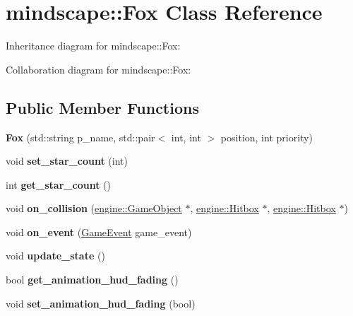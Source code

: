 \hypertarget{classmindscape_1_1_fox}{}\section{mindscape\+:\+:Fox Class Reference}
\label{classmindscape_1_1_fox}


Inheritance diagram for mindscape\+:\+:Fox\+:


Collaboration diagram for mindscape\+:\+:Fox\+:
\subsection*{Public Member Functions}
\begin{DoxyCompactItemize}
\item 
{\bfseries Fox} (std\+::string p\+\_\+name, std\+::pair$<$ int, int $>$ position, int priority)\hypertarget{classmindscape_1_1_fox_a9c5e270000519e07ded5c549d16ad057}{}\label{classmindscape_1_1_fox_a9c5e270000519e07ded5c549d16ad057}

\item 
void {\bfseries set\+\_\+star\+\_\+count} (int)\hypertarget{classmindscape_1_1_fox_a6ee5b7c313ccc0d08fbf51ffddd09e72}{}\label{classmindscape_1_1_fox_a6ee5b7c313ccc0d08fbf51ffddd09e72}

\item 
int {\bfseries get\+\_\+star\+\_\+count} ()\hypertarget{classmindscape_1_1_fox_af8dc5d2ee06af247f7de5c7f374f20e5}{}\label{classmindscape_1_1_fox_af8dc5d2ee06af247f7de5c7f374f20e5}

\item 
void {\bfseries on\+\_\+collision} (\hyperlink{classengine_1_1_game_object}{engine\+::\+Game\+Object} $\ast$, \hyperlink{classengine_1_1_hitbox}{engine\+::\+Hitbox} $\ast$, \hyperlink{classengine_1_1_hitbox}{engine\+::\+Hitbox} $\ast$)\hypertarget{classmindscape_1_1_fox_a29feec4478a5d1440cfd901417fec6eb}{}\label{classmindscape_1_1_fox_a29feec4478a5d1440cfd901417fec6eb}

\item 
void {\bfseries on\+\_\+event} (\hyperlink{class_game_event}{Game\+Event} game\+\_\+event)\hypertarget{classmindscape_1_1_fox_a5a4a3bb811104e0f8e4e063bf5d1f3c4}{}\label{classmindscape_1_1_fox_a5a4a3bb811104e0f8e4e063bf5d1f3c4}

\item 
void {\bfseries update\+\_\+state} ()\hypertarget{classmindscape_1_1_fox_aad5bf81351822350233f9da732db7cdd}{}\label{classmindscape_1_1_fox_aad5bf81351822350233f9da732db7cdd}

\item 
bool {\bfseries get\+\_\+animation\+\_\+hud\+\_\+fading} ()\hypertarget{classmindscape_1_1_fox_afdec0e4a0a38094f8ae0e5471aebe675}{}\label{classmindscape_1_1_fox_afdec0e4a0a38094f8ae0e5471aebe675}

\item 
void {\bfseries set\+\_\+animation\+\_\+hud\+\_\+fading} (bool)\hypertarget{classmindscape_1_1_fox_a16af4e6ebdd976b59f9542d1f4a0be7a}{}\label{classmindscape_1_1_fox_a16af4e6ebdd976b59f9542d1f4a0be7a}

\end{DoxyCompactItemize}
